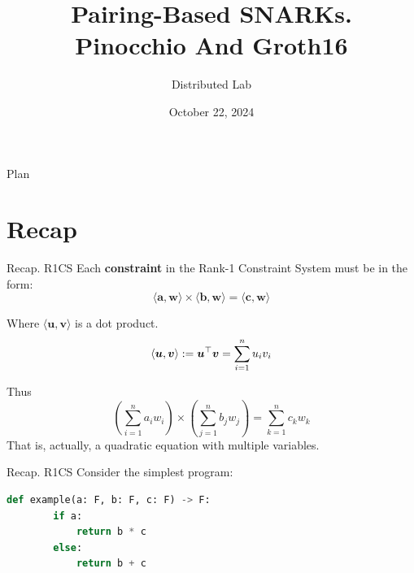 \documentclass{zkdl-presentation-template}
\title[zk-SNARK: Part III]{\textbf{Pairing-Based SNARKs.\\Pinocchio And Groth16}}
\author{Distributed Lab}
\date{October 22, 2024}
\begin{document}

    \begin{frame}{Plan}
        \tableofcontents
    \end{frame}

    \section{Recap}

    \begin{frame}{Recap. R1CS}
        Each \textbf{constraint} in the Rank-1 Constraint System must be in the form:
        \begin{equation*}
            \langle \boldsymbol{a}, \boldsymbol{w}\rangle \times \langle \boldsymbol{b}, \boldsymbol{w}\rangle = \langle \boldsymbol{c}, \boldsymbol{w}\rangle
        \end{equation*}\pause
        
        Where $\langle \boldsymbol{u}, \boldsymbol{v}\rangle$ is a dot product.
        \vspace{-10pt}
        \begin{equation*}
            \langle \boldsymbol{u}, \boldsymbol{v} \rangle := \boldsymbol{u}^{\top}\boldsymbol{v} = \sum_{i=1}^{n} u_i v_i 
            \vspace{-5pt}
        \end{equation*}\pause
        
        Thus
        \vspace{-5pt}
        \begin{equation*}
            \left(\sum_{i=1}^{n} a_i w_i\right) \times \left(\sum_{j=1}^{n} b_j w_j\right) = \sum_{k=1}^{n} c_k w_k
        \end{equation*}
        That is, actually, a quadratic equation with multiple variables.
    \end{frame}

    \begin{frame}[fragile]{Recap. R1CS}
        Consider the simplest program:
        \vspace{10pt}
        \begin{lstlisting}[language=Python,numbers=none]
    def example(a: F, b: F, c: F) -> F:
        if a:
            return b * c 
        else:
            return b + c
        \end{lstlisting}
    \end{frame}
\end{document}
